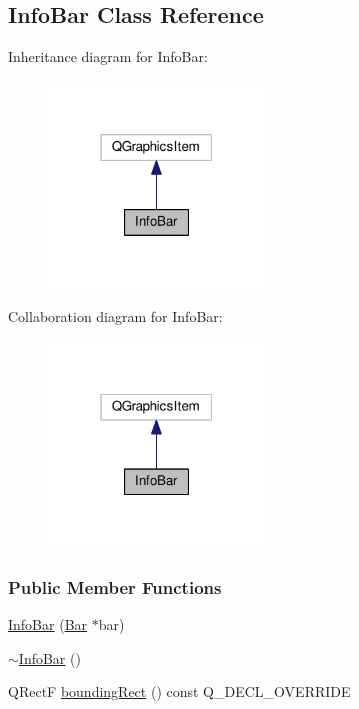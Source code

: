 \hypertarget{class_info_bar}{}\subsection{Info\+Bar Class Reference}
\label{class_info_bar}


Inheritance diagram for Info\+Bar\+:\nopagebreak
\begin{figure}[H]
\begin{center}
\leavevmode
\includegraphics[width=163pt]{class_info_bar__inherit__graph}
\end{center}
\end{figure}


Collaboration diagram for Info\+Bar\+:\nopagebreak
\begin{figure}[H]
\begin{center}
\leavevmode
\includegraphics[width=163pt]{class_info_bar__coll__graph}
\end{center}
\end{figure}
\subsubsection*{Public Member Functions}
\begin{DoxyCompactItemize}
\item 
\hyperlink{class_info_bar_aab5c08f226901c8827a97efbdfb5122a}{Info\+Bar} (\hyperlink{class_bar}{Bar} $\ast$bar)
\item 
\hyperlink{class_info_bar_a954baa28d750739c80c029818d267d8e}{$\sim$\+Info\+Bar} ()
\item 
Q\+Rect\+F \hyperlink{class_info_bar_a564aacb3b64bdb5fbcaef8a432a0b49e}{bounding\+Rect} () const Q\+\_\+\+D\+E\+C\+L\+\_\+\+O\+V\+E\+R\+R\+I\+D\+E
\end{DoxyCompactItemize}
